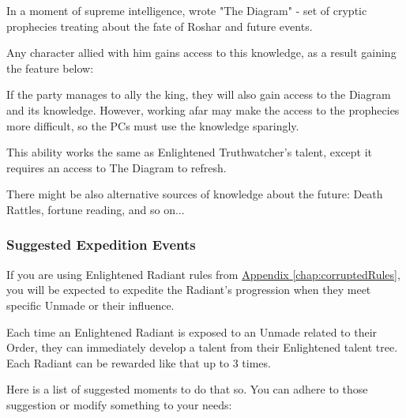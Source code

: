 In a moment of supreme intelligence, \npcTaravangian{} wrote "The Diagram" - set of cryptic prophecies treating about the fate of Roshar and future events.

Any character allied with him gains access to this knowledge, as a result gaining the feature below:

\abilityFutureKnowledge{}

If the party manages to ally the king, they will also gain access to the Diagram and its knowledge. However, working afar may make the access to the prophecies more difficult, so the PCs must use the knowledge sparingly.

This ability works the same as Enlightened Truthwatcher's \talentTruthwatcherAlterFortuneName{} talent, except it requires an access to The Diagram to refresh.

There might be also alternative sources of knowledge about the future: Death Rattles, fortune reading, and so on...


\subsubsection{Suggested Expedition Events}

If you are using Enlightened Radiant rules from \hyperref[chap:corruptedRules]{Appendix \ref{chap:corruptedRules}}, you will be expected to expedite the Radiant's progression when they meet specific Unmade or their influence.

Each time an Enlightened Radiant is exposed to an Unmade related to their Order, they can immediately develop a talent from their Enlightened talent tree. Each Radiant can be rewarded like that up to 3 times.

Here is a list of suggested moments to do that so. You can adhere to those suggestion or modify something to your needs:

